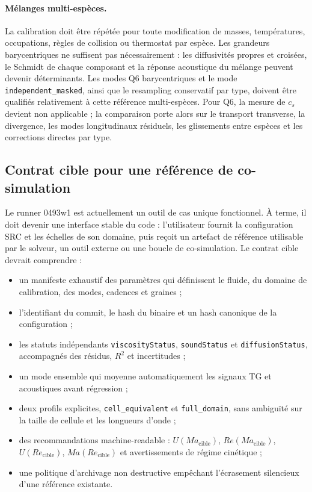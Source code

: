 \documentclass[11pt,a4paper]{article}
\begin{document}
\paragraph{Mélanges multi-espèces.}
La calibration doit être répétée pour toute modification de masses, températures, occupations, règles de collision ou thermostat par espèce. Les grandeurs barycentriques ne suffisent pas nécessairement : les diffusivités propres et croisées, le Schmidt de chaque composant et la réponse acoustique du mélange peuvent devenir déterminants. Les modes Q6 barycentriques et le mode \texttt{independent\_masked}, ainsi que le resampling conservatif par type, doivent être qualifiés relativement à cette référence multi-espèces. Pour Q6, la mesure de $c_s$ devient non applicable ; la comparaison porte alors sur le transport transverse, la divergence, les modes longitudinaux résiduels, les glissements entre espèces et les corrections directes par type.

\subsection{Contrat cible pour une référence de co-simulation}

Le runner 0493w1 est actuellement un outil de cas unique fonctionnel. À terme, il doit devenir une interface stable du code : l'utilisateur fournit la configuration SRC et les échelles de son domaine, puis reçoit un artefact de référence utilisable par le solveur, un outil externe ou une boucle de co-simulation. Le contrat cible devrait comprendre :
\begin{itemize}[leftmargin=*]
  \item un manifeste exhaustif des paramètres qui définissent le fluide, du domaine de calibration, des modes, cadences et graines ;
  \item l'identifiant du commit, le hash du binaire et un hash canonique de la configuration ;
  \item les statuts indépendants \texttt{viscosityStatus}, \texttt{soundStatus} et \texttt{diffusionStatus}, accompagnés des résidus, $R^2$ et incertitudes ;
  \item un mode ensemble qui moyenne automatiquement les signaux TG et acoustiques avant régression ;
  \item deux profils explicites, \texttt{cell\_equivalent} et \texttt{full\_domain}, sans ambiguïté sur la taille de cellule et les longueurs d'onde ;
  \item des recommandations machine-readable : $U(Ma_{\mathrm{cible}})$, $Re(Ma_{\mathrm{cible}})$, $U(Re_{\mathrm{cible}})$, $Ma(Re_{\mathrm{cible}})$ et avertissements de régime cinétique ;
  \item une politique d'archivage non destructive empêchant l'écrasement silencieux d'une référence existante.
\end{itemize}
\end{document}
